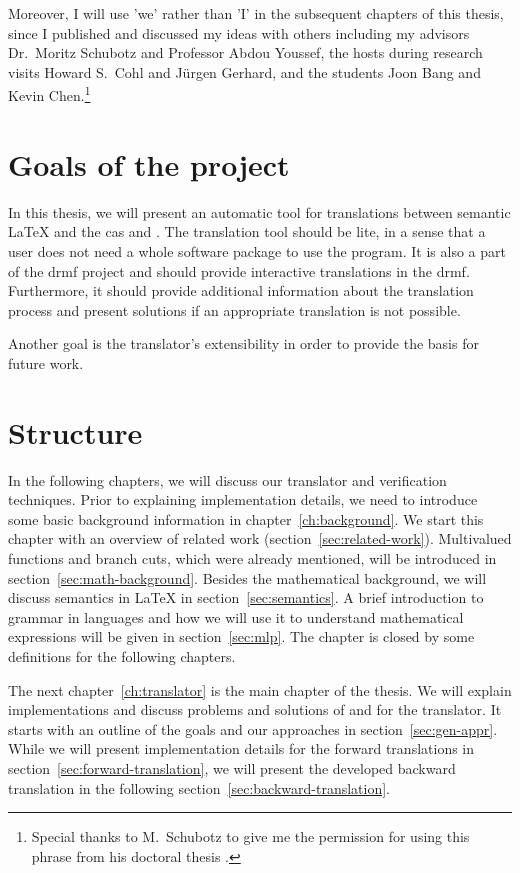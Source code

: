 Moreover, I will use 'we' rather than 'I' in the subsequent chapters of this thesis, since I published and discussed my ideas with others including my advisors Dr.~Moritz Schubotz and Professor Abdou Youssef, the hosts during research visits Howard S.~Cohl and J\"urgen Gerhard, and the students Joon Bang and Kevin Chen.\footnote{Special thanks to M.~Schubotz to give me the permission for using this phrase from his doctoral thesis \cite{MORITZ:Dis}.} 

\section{Goals of the project}
In this thesis, we will present an automatic tool for translations between semantic \LaTeX{} and the \gls*{cas} \Maple{} and \Mathematica. The translation tool should be lite, in a sense that a user does not need a whole software package to use the program. It is also a part of the \gls*{drmf} project and should provide interactive translations in the \gls*{drmf}. Furthermore, it should provide additional information about the translation process and present solutions if an appropriate translation is not possible.

Another goal is the translator's extensibility in order to provide the basis for future work.

\section{Structure}
In the following chapters, we will discuss our translator and verification techniques. Prior to explaining implementation details, we need to introduce some basic background information in chapter~\ref{ch:background}. We start this chapter with an overview of related work (section~\ref{sec:related-work}). Multivalued functions and branch cuts, which were already mentioned, will be introduced in section~\ref{sec:math-background}. Besides the mathematical background, we will discuss semantics in \LaTeX{} in section~\ref{sec:semantics}. A brief introduction to grammar in languages and how we will use it to understand mathematical expressions will be given in section~\ref{sec:mlp}. The chapter is closed by some definitions for the following chapters.

The next chapter~\ref{ch:translator} is the main chapter of the thesis. We will explain implementations and discuss problems and solutions of and for the translator. It starts with an outline of the goals and our approaches in section~\ref{sec:gen-appr}. While we will present implementation details for the forward translations in section~\ref{sec:forward-translation}, we will present the developed backward translation in the following section~\ref{sec:backward-translation}.


